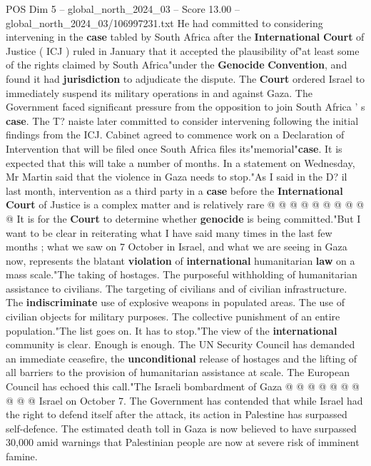 \begin{textsample}{POS Dim 5 – global\_north\_2024\_03 – Score 13.00 – global\_north\_2024\_03/106997231.txt}  \label{ex:f5_pos_296}
He had committed to considering intervening in the \textbf{case} tabled by South Africa after the \textbf{International} \textbf{Court} of Justice ( ICJ ) ruled in January that it accepted the plausibility of"at least some of the rights claimed by South Africa"under the \textbf{Genocide} \textbf{Convention}, and found it had \textbf{jurisdiction} to adjudicate the dispute.
The \textbf{Court} ordered Israel to immediately suspend its military operations in and against Gaza.
The Government faced significant pressure from the opposition to join South Africa ' s \textbf{case}.
The T? naiste later committed to consider intervening following the initial findings from the ICJ.
Cabinet agreed to commence work on a Declaration of Intervention that will be filed once South Africa files its"memorial"\textbf{case}.
It is expected that this will take a number of months.
In a statement on Wednesday, Mr Martin said that the violence in Gaza needs to stop."As I said in the D? il last month, intervention as a third party in a \textbf{case} before the \textbf{International} \textbf{Court} of Justice is a complex matter and is relatively rare @ @ @ @ @ @ @ @ @ @ It is for the \textbf{Court} to determine whether \textbf{genocide} is being committed."But I want to be clear in reiterating what I have said many times in the last few months ; what we saw on 7 October in Israel, and what we are seeing in Gaza now, represents the blatant \textbf{violation} of \textbf{international} humanitarian \textbf{law} on a mass scale."The taking of hostages.
The purposeful withholding of humanitarian assistance to civilians.
The targeting of civilians and of civilian infrastructure.
The \textbf{indiscriminate} use of explosive weapons in populated areas.
The use of civilian objects for military purposes.
The collective punishment of an entire population."The list goes on.
It has to stop."The view of the \textbf{international} community is clear.
Enough is enough.
The UN Security Council has demanded an immediate ceasefire, the \textbf{unconditional} release of hostages and the lifting of all barriers to the provision of humanitarian assistance at scale.
The European Council has echoed this call."The Israeli bombardment of Gaza @ @ @ @ @ @ @ @ @ @ Israel on October 7.
The Government has contended that while Israel had the right to defend itself after the attack, its action in Palestine has surpassed self-defence.
The estimated death toll in Gaza is now believed to have surpassed 30,000 amid warnings that Palestinian people are now at severe risk of imminent famine.

\end{textsample}
